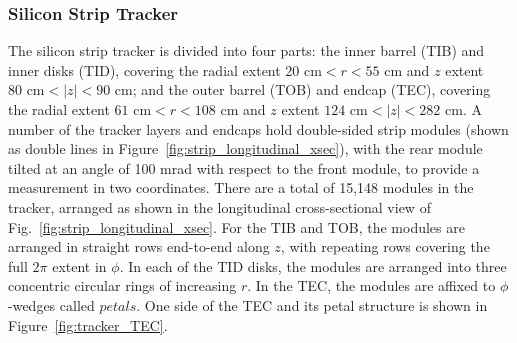 \documentclass[dissertation.tex]{subfiles}
\begin{document}
\subsubsection{Silicon Strip Tracker}
\label{sec:Silicon Strip Tracker}

The silicon strip tracker is divided into four parts: the inner barrel (TIB) and inner disks (TID), covering the radial extent $20\mbox{ cm} < r < 55\mbox{ cm}$ and $z$ extent $80\mbox{ cm} < |z| < 90\mbox{ cm}$; and the outer barrel (TOB) and endcap (TEC), covering the radial extent $61\mbox{ cm} < r < 108\mbox{ cm}$ and $z$ extent $124\mbox{ cm} < |z| < 282\mbox{ cm}$.  A number of the tracker layers and endcaps hold double-sided strip modules (shown as double lines in Figure~\ref{fig:strip_longitudinal_xsec}), with the rear module tilted at an angle of 100 mrad with respect to the front module, to provide a measurement in two coordinates.  There are a total of 15,148 modules in the tracker, arranged as shown in the longitudinal cross-sectional view of Fig.~\ref{fig:strip_longitudinal_xsec}.  For the TIB and TOB, the modules are arranged in straight rows end-to-end along $z$, with repeating rows covering the full $2\pi$ extent in $\phi$.  In each of the TID disks, the modules are arranged into three concentric circular rings of increasing $r$.  In the TEC, the modules are affixed to $\phi$-wedges called $\textit{petals}$.   One side of the TEC and its petal structure is shown in Figure~\ref{fig:tracker_TEC}.
\end{document}
